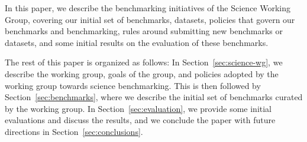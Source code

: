 In this paper, we describe the benchmarking initiatives of the Science Working Group, covering our initial set of benchmarks, datasets, policies that govern our benchmarks and benchmarking, rules around submitting new benchmarks or datasets, and some initial results on the evaluation of these benchmarks. 

The rest of this paper is organized as follows: In Section~\ref{sec:science-wg}, we describe the working group, goals of the group, and policies adopted by the working group towards science benchmarking. This is then followed by Section~\ref{sec:benchmarks}, where we describe the initial set of benchmarks curated by the working group. In Section~\ref{sec:evaluation}, we provide some initial evaluations and discuss the results, and we conclude the paper with future directions in Section~\ref{sec:conclusions}.